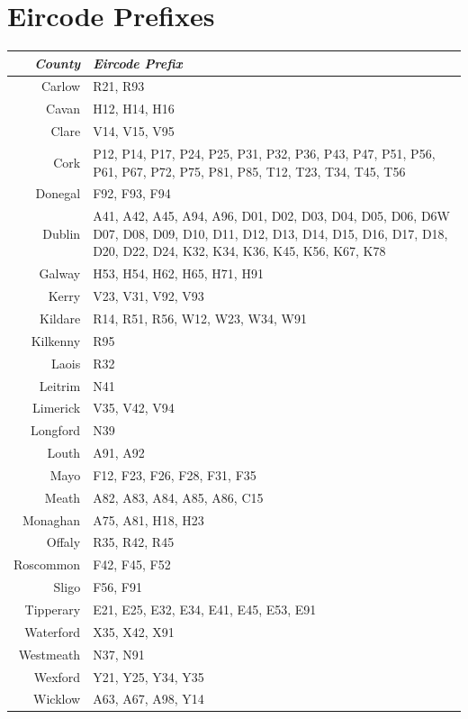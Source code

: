 \documentclass[twocolumn]{article}
\begin{document}
\section{Eircode Prefixes\label{a:eircode}}
\begin{tabularx}{0.5\textwidth}{r X}
    \textit{County} & \textit{Eircode Prefix} \\ \hline
    Carlow & R21, R93 \\ \hline
    Cavan & H12, H14, H16 \\ \hline
    Clare & V14, V15, V95 \\ \hline
    Cork & P12, P14, P17, P24, P25, P31, P32, P36, P43, P47, P51, P56, P61, P67, P72, P75, P81, P85, T12, T23, T34, T45, T56 \\ \hline
    Donegal & F92, F93, F94 \\ \hline
    Dublin & A41, A42, A45, A94, A96, D01, D02, D03, D04, D05, D06, D6W D07, D08, D09, D10, D11, D12, D13, D14, D15, D16, D17, D18, D20, D22, D24, K32, K34, K36, K45, K56, K67, K78 \\ \hline
    Galway & H53, H54, H62, H65, H71, H91 \\ \hline
    Kerry & V23, V31, V92, V93 \\ \hline
    Kildare & R14, R51, R56, W12, W23, W34, W91 \\ \hline
    Kilkenny & R95 \\ \hline
    Laois & R32 \\ \hline
    Leitrim & N41 \\ \hline
    Limerick & V35, V42, V94 \\ \hline
    Longford & N39 \\ \hline
    Louth & A91, A92 \\ \hline
    Mayo & F12, F23, F26, F28, F31, F35 \\ \hline
    Meath & A82, A83, A84, A85, A86, C15 \\ \hline
    Monaghan & A75, A81, H18, H23 \\ \hline
    Offaly & R35, R42, R45 \\ \hline
    Roscommon & F42, F45, F52 \\ \hline
    Sligo & F56, F91 \\ \hline
    Tipperary & E21, E25, E32, E34, E41, E45, E53, E91 \\ \hline
    Waterford & X35, X42, X91 \\ \hline
    Westmeath & N37, N91 \\ \hline
    Wexford & Y21, Y25, Y34, Y35 \\ \hline
    Wicklow & A63, A67, A98, Y14
\end{tabularx}
\end{document}
